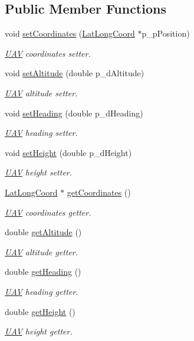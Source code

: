 \subsection*{Public Member Functions}
\begin{DoxyCompactItemize}
\item 
void \hyperlink{class_u_a_v_ae2edf06ff37375b5ed09fabddabc7f45}{set\-Coordinates} (\hyperlink{class_lat_long_coord}{Lat\-Long\-Coord} $\ast$p\-\_\-p\-Position)
\begin{DoxyCompactList}\small\item\em \hyperlink{class_u_a_v}{U\-A\-V} coordinates setter. \end{DoxyCompactList}\item 
void \hyperlink{class_u_a_v_a64a208c62f67f6c3cdc2cb6c803bb47f}{set\-Altitude} (double p\-\_\-d\-Altitude)
\begin{DoxyCompactList}\small\item\em \hyperlink{class_u_a_v}{U\-A\-V} altitude setter. \end{DoxyCompactList}\item 
void \hyperlink{class_u_a_v_a34eaae9ab7fc208724971ec306ca79de}{set\-Heading} (double p\-\_\-d\-Heading)
\begin{DoxyCompactList}\small\item\em \hyperlink{class_u_a_v}{U\-A\-V} heading setter. \end{DoxyCompactList}\item 
void \hyperlink{class_u_a_v_addc18f8ddfdd6066f5001c4f682b45c0}{set\-Height} (double p\-\_\-d\-Height)
\begin{DoxyCompactList}\small\item\em \hyperlink{class_u_a_v}{U\-A\-V} height setter. \end{DoxyCompactList}\item 
\hyperlink{class_lat_long_coord}{Lat\-Long\-Coord} $\ast$ \hyperlink{class_u_a_v_a7223e5681ab9a59ad2f5466b7db2da27}{get\-Coordinates} ()
\begin{DoxyCompactList}\small\item\em \hyperlink{class_u_a_v}{U\-A\-V} coordinates getter. \end{DoxyCompactList}\item 
double \hyperlink{class_u_a_v_ab73508cd3027919e06e18d9ef3e88131}{get\-Altitude} ()
\begin{DoxyCompactList}\small\item\em \hyperlink{class_u_a_v}{U\-A\-V} altitude getter. \end{DoxyCompactList}\item 
double \hyperlink{class_u_a_v_a42928d41570e1f0e0eba674806940eca}{get\-Heading} ()
\begin{DoxyCompactList}\small\item\em \hyperlink{class_u_a_v}{U\-A\-V} heading getter. \end{DoxyCompactList}\item 
double \hyperlink{class_u_a_v_a786a321d2638b6a035ddcb01d99e6a2a}{get\-Height} ()
\begin{DoxyCompactList}\small\item\em \hyperlink{class_u_a_v}{U\-A\-V} height getter. \end{DoxyCompactList}\end{DoxyCompactItemize}
